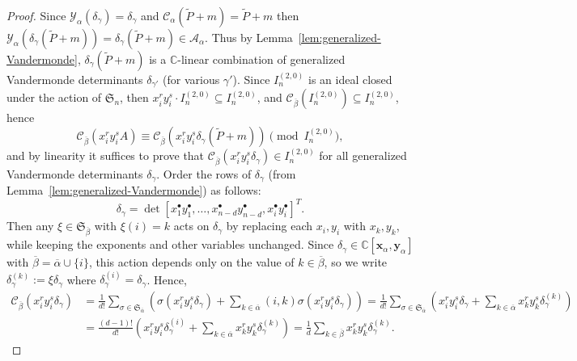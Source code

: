 \documentclass[11pt, noadjust, reqno]{amsart}
\theoremstyle{definition}
\theoremstyle{remark}
\numberwithin{equation}{section}
\newcommand{\0}{\emptyset}
\newcommand{\C}{\mathbb{C}}
\renewcommand{\S}{\mathfrak{S}}
\newcommand{\cC}{\mathcal{C}}
\newcommand{\cY}{\mathcal{Y}}
\begin{document}
\begin{proof}
    Since $\cY_\alpha(\delta_\gamma) = \delta_\gamma$ and $\cC_{\alpha}(\widetilde{P}+m) = \widetilde{P}+m$ then $\cY_\alpha(\delta_\gamma (\widetilde{P}+m)) = \delta_\gamma (\widetilde{P} +m)\in \mathcal{A}_\alpha$. 
    Thus by Lemma~\ref{lem:generalized-Vandermonde}, $\delta_\gamma (\widetilde{P} +m)$ is a $\C$-linear combination of generalized Vandermonde determinants $\delta_{\gamma'}$ (for various $\gamma'$).
    Since $I_n^{(2,0)}$ is an ideal closed under the action of $\mathfrak{S}_n$, then $x_i^r y_i^s \cdot I_n^{(2,0)} \subseteq I_n^{(2,0)}$, and $\cC_{\overline{\beta}}(I_n^{(2,0)}) \subseteq I_n^{(2,0)}$, hence
    \begin{equation*}
        \cC_{\overline{\beta}}(x_i^r y_i^s A) \equiv \cC_{\overline{\beta}}(x_i^r y_i^s \delta_\gamma (\widetilde{P}+m)) \pmod {I_n^{(2,0)}},
    \end{equation*}
    and by linearity it suffices to prove that $\cC_{\overline{\beta}}(x_i^r y_i^s \delta_\gamma) \in I_n^{(2,0)} $ for all generalized Vandermonde determinants $\delta_\gamma$.    
    Order the rows of $\delta_\gamma$ (from Lemma~\ref{lem:generalized-Vandermonde}) as follows:
\[
\delta_\gamma = \det [ x_1^\bullet y_1^\bullet, \dots , x_{n-d}^\bullet y_{n-d}^{\bullet}, x_i^\bullet y_i^\bullet]^T.
\]
Then any $\xi \in \mathfrak{S}_{\overline{\beta}}$ with $\xi(i) = k$ acts on $\delta_\gamma$ by replacing each $x_i,y_i$ with $x_k,y_k$, while keeping the exponents and other variables unchanged. Since $\delta_\gamma \in \C[\bm{x}_\alpha, \bm{y}_\alpha]$ with $\overline{\beta} = \overline{\alpha} \cup \{i\}$, this action depends only on the value of $k \in \overline{\beta}$, so we write $\delta_\gamma^{(k)} := \xi \delta_\gamma$ where $\delta_\gamma^{(i)} = \delta_\gamma$. Hence, 
    \begin{align*}
        \cC_{\overline{\beta}}(x_i^r y_i^s \delta_\gamma) 
        &= \frac{1}{d!} \sum_{\sigma \in \S_{\overline{\alpha}}} \left(
        \sigma(x_i^r y_i^s \delta_\gamma) + \sum_{k \in \overline{\alpha}} (i,k)\sigma(x_i^r y_i^s \delta_\gamma) \right) 
        = \frac{1}{d!} \sum_{\sigma \in \S_{\overline{\alpha}}} \left(
        x_i^r y_i^s \delta_\gamma + \sum_{k \in \overline{\alpha}}  x_k^r y_k^s \delta_\gamma^{(k)} \right) \\
        &= \frac{(d-1)!}{d!} \left(
        x_i^r y_i^s \delta_\gamma^{(i)} + \sum_{k \in \overline{\alpha}}  x_k^r y_k^s \delta_\gamma^{(k)} \right) 
        = \frac{1}{d}  \sum_{k \in \overline{\beta}}  x_k^r y_k^s \delta_\gamma^{(k)} .
    \end{align*}


\end{proof}
\end{document}
